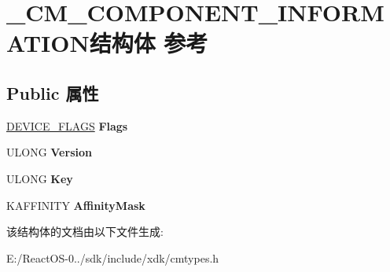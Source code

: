 \hypertarget{struct___c_m___c_o_m_p_o_n_e_n_t___i_n_f_o_r_m_a_t_i_o_n}{}\section{\+\_\+\+C\+M\+\_\+\+C\+O\+M\+P\+O\+N\+E\+N\+T\+\_\+\+I\+N\+F\+O\+R\+M\+A\+T\+I\+O\+N结构体 参考}
\label{struct___c_m___c_o_m_p_o_n_e_n_t___i_n_f_o_r_m_a_t_i_o_n}
\subsection*{Public 属性}
\begin{DoxyCompactItemize}
\item 
\mbox{\label{struct___c_m___c_o_m_p_o_n_e_n_t___i_n_f_o_r_m_a_t_i_o_n_a32e13245638e9cd7c7fd31a5d6a1fb72}} 
\hyperlink{struct___d_e_v_i_c_e___f_l_a_g_s}{D\+E\+V\+I\+C\+E\+\_\+\+F\+L\+A\+GS} {\bfseries Flags}
\item 
\mbox{\label{struct___c_m___c_o_m_p_o_n_e_n_t___i_n_f_o_r_m_a_t_i_o_n_acd51cffc3b3649a063409748d3962d7f}} 
U\+L\+O\+NG {\bfseries Version}
\item 
\mbox{\label{struct___c_m___c_o_m_p_o_n_e_n_t___i_n_f_o_r_m_a_t_i_o_n_a561adff67e5af59c6df9de0b5709510b}} 
U\+L\+O\+NG {\bfseries Key}
\item 
\mbox{\label{struct___c_m___c_o_m_p_o_n_e_n_t___i_n_f_o_r_m_a_t_i_o_n_aa3580060d0722b30bb3d0fff6be8457f}} 
K\+A\+F\+F\+I\+N\+I\+TY {\bfseries Affinity\+Mask}
\end{DoxyCompactItemize}


该结构体的文档由以下文件生成\+:\begin{DoxyCompactItemize}
\item 
E\+:/\+React\+O\+S-\/0../sdk/include/xdk/cmtypes.\+h\end{DoxyCompactItemize}
